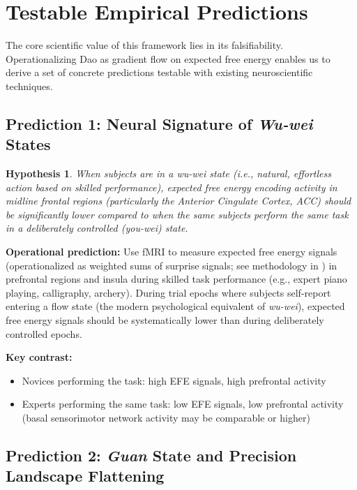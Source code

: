 \documentclass[11pt,a4paper]{article}
\newtheorem{hypothesis}[proposition]{Hypothesis}
\begin{document}
\section{Testable Empirical Predictions}

The core scientific value of this framework lies in its falsifiability. Operationalizing Dao as gradient flow on expected free energy enables us to derive a set of concrete predictions testable with existing neuroscientific techniques.

\subsection{Prediction 1: Neural Signature of \textit{Wu-wei} States}

\begin{hypothesis}
When subjects are in a \textit{wu-wei} state (i.e., natural, effortless action based on skilled performance), expected free energy encoding activity in midline frontal regions (particularly the Anterior Cingulate Cortex, ACC) should be significantly lower compared to when the same subjects perform the same task in a deliberately controlled (\textit{you-wei}) state.
\end{hypothesis}

\textbf{Operational prediction:} Use fMRI to measure expected free energy signals (operationalized as weighted sums of surprise signals; see methodology in \cite{Schwartenbeck2015}) in prefrontal regions and insula during skilled task performance (e.g., expert piano playing, calligraphy, archery). During trial epochs where subjects self-report entering a flow state (the modern psychological equivalent of \textit{wu-wei}), expected free energy signals should be systematically lower than during deliberately controlled epochs.

\textbf{Key contrast:}
\begin{itemize}[nosep]
    \item Novices performing the task: high EFE signals, high prefrontal activity
    \item Experts performing the same task: low EFE signals, low prefrontal activity (basal sensorimotor network activity may be comparable or higher)
\end{itemize}

\subsection{Prediction 2: \textit{Guan} State and Precision Landscape Flattening}
\end{document}

